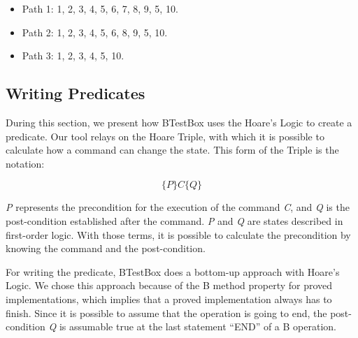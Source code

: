 \documentclass[runningheads]{llncs}
\begin{document}
\begin{itemize}
    \item Path 1: 1, 2, 3, 4, 5, 6, 7, 8, 9, 5, 10.
    \item Path 2: 1, 2, 3, 4, 5, 6, 8, 9, 5, 10.
    \item Path 3: 1, 2, 3, 4, 5, 10.
\end{itemize}

\subsection{Writing Predicates} \label{writingPredicates}

During this section, we present how BTestBox uses the Hoare’s Logic to create a predicate. Our tool relays on the Hoare Triple, with which it is possible to calculate how a command can change the state. 
This form of the Triple is the notation:

$$\{P\} C \{Q\}$$

\textit{P} represents the precondition for the execution of the command \textit{C}, and \textit{Q} is the post-condition established after the command. \textit{P} and \textit{Q} are states described in first-order logic. With those terms, it is possible to calculate the precondition by knowing the command and the post-condition. 

For writing the predicate, BTestBox does a bottom-up approach with Hoare's Logic. We chose this approach because of the B method property for proved implementations, which implies that a proved implementation always has to finish. Since it is possible to assume that the operation is going to end, the post-condition \textit{Q} is assumable true at the last statement ``END'' of a B operation.

\end{document}
